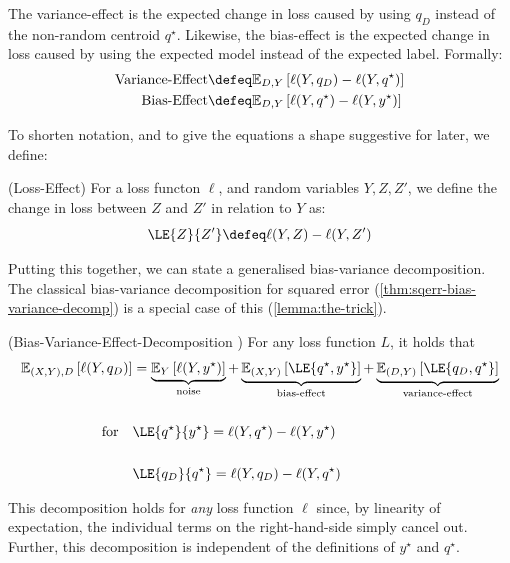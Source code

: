 \documentclass[
    a4paper, %
	fontsize=10pt, %
	twoside=false, %
]{kaobook}
\begin{document}
The variance-effect is the expected change in loss caused by using $q_{D}$ instead of the non-random centroid $q^\star$. Likewise, the bias-effect is the expected change in loss caused by using the expected model instead of the expected label. 
Formally:
\begin{align*}
\text{Variance-Effect} &\defeq \mathbb{E}_{D,Y}\left[ \ell(Y, q_{D}) - \ell(Y, q^\star) \right] \\
\text{Bias-Effect} &\defeq \mathbb{E}_{D,Y}\left[ \ell(Y, q^\star) - \ell(Y, y^\star) \right] 
\end{align*}

To shorten notation, and to give the equations a shape suggestive for later, we define:
\begin{definition} (Loss-Effect) For a loss functon $\ell$, and random variables $Y, Z, Z'$, we define the change in loss between $Z$ and $Z'$ in relation to $Y$ as:
  $$
  \LE{Z}{Z'} \defeq \ell(Y, Z) - \ell(Y, Z')
  $$
  \label{def:loss-effect}
\end{definition}

Putting this together, we can state a generalised bias-variance decomposition. The classical bias-variance decomposition for squared error (\ref{thm:sqerr-bias-variance-decomp}) is a special case of this (\ref{lemma:the-trick}).

\begin{theorem} (Bias-Variance-Effect-Decomposition \cite{james_GeneralizationsBiasVariance_})
For any loss function $L$, it holds that
\begin{align*}
\mathbb{E}_{(X,Y), D}\left[ \ell(Y, q_{D}) \right]  
&= 
\underbrace{\mathbb{E}_{Y}\left[ \ell(Y, y^\star) \right]  }_{\text{noise}}
+ \underbrace{\mathbb{E}_{(X,Y)}\left[ \LE{q^\star, y^\star} \right] }_{\text{bias-effect}}
+ \underbrace{\mathbb{E}_{(D,Y)}\left[ \LE{q_D, q^\star} \right] }_{\text{variance-effect}}  \\
\\ 
\text{for} \hspace{1em}
& \LE{q^\star}{y^\star} = \ell(Y, q^\star) - \ell(Y, y^\star) \\ \\
&\LE{q_{D}}{q^\star} = \ell(Y, q_{D}) - \ell(Y, q^\star)
\end{align*}
\end{theorem}
This decomposition holds for \textit{any} loss function $\ell$ since, by linearity of expectation, the individual terms on the right-hand-side simply cancel out. Further, this decomposition is independent of the definitions of $y^\star$ and $q^\star$.
\end{document}
